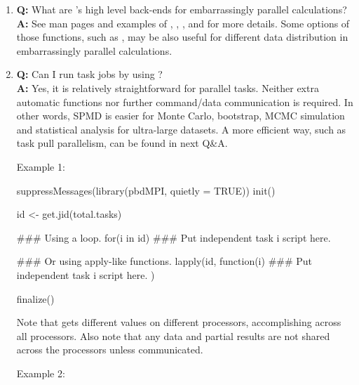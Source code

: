 \begin{enumerate}
\item {\bf\color{blue} Q:}
      What are 's high level back-ends for embarrassingly parallel
      calculations? \\
      {\bf\color{blue} A:}
      See man pages and examples of , ,
      , and  for more details.
      Some options of those functions, such as , may be also
      useful for different data distribution in embarrassingly parallel
      calculations.

\item {\bf\color{blue} Q:}
      Can I run task jobs by using ? \\
      {\bf\color{blue} A:}
      Yes, it is relatively straightforward for parallel
      tasks. Neither extra automatic functions nor further
      command/data communication is required.  In other words, SPMD is
      easier for Monte Carlo, bootstrap, MCMC simulation and
      statistical analysis for ultra-large datasets.
      A more efficient way, such as task pull parallelism, can be found
      in next Q\&A.

Example 1:
\begin{Code}[title=SPMD R Script]
  suppressMessages(library(pbdMPI, quietly = TRUE))
  init()

  id <- get.jid(total.tasks)

  ### Using a loop.
  for(i in id){
    ### Put independent task i script here.
  }

  ### Or using apply-like functions.
  lapply(id, function(i){
    ### Put independent task i script here.
  })

  finalize()
\end{Code}

Note that  gets different values on different processors,
accomplishing  across all processors. Also note that
any data and partial results are not shared across the processors
unless communicated.

Example 2:
\end{enumerate}

